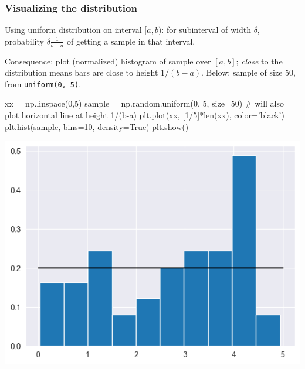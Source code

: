\documentclass{beamer}
\newenvironment{codeblock}
    {\hfill\begin{beamerboxesrounded}[lower=codecol, width=0.8\textwidth]
    \medskip

    }
    { 
    \end{beamerboxesrounded}\hfill
    }
\theoremstyle{example}
\newcommand{\ttt}[1]{{\small\texttt{#1}}}
\begin{document}
\begin{frame}[fragile]
\frametitle{Visualizing the distribution}
Using uniform distribution on interval $[a,b)$: for subinterval of width $\delta$, probability $\delta\frac{1}{b-a}$ of getting a sample in that interval.

Consequence: plot (normalized) histogram of sample over $[a,b]$; \emph{close} to the distribution means bars are close to height $1/(b-a)$.\newline 
Below: sample of size 50, from \ttt{uniform(0, 5)}.

\begin{codeblock}

\begin{python}
xx = np.linspace(0,5)
sample = np.random.uniform(0, 5, size=50)
# will also plot horizontal line at height 1/(b-a)
plt.plot(xx, [1/5]*len(xx), color='black')
plt.hist(sample, bins=10, density=True)
plt.show()
\end{python}

\end{codeblock}

\centering
\includegraphics[height=0.35\textheight]{histogram_of_sample1.png}

\end{frame}
\end{document}
